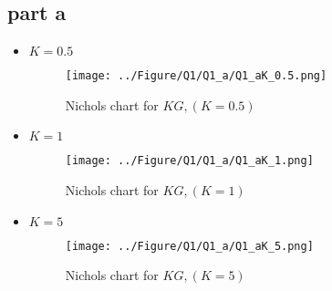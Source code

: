\subsection{part a}
\begin{itemize}
    \item $K=0.5$
    \begin{figure}[H]
        \caption{Nichols chart for $KG, (K=0.5)$}
        \centering
        \texttt{[image: ../Figure/Q1/Q1\_a/Q1\_aK\_0.5.png]}
    \end{figure}
    \item $K=1$
    \begin{figure}[H]
        \caption{Nichols chart for $KG, (K=1)$}
        \centering
        \texttt{[image: ../Figure/Q1/Q1\_a/Q1\_aK\_1.png]}
    \end{figure}
    \item $K=5$
    \begin{figure}[H]
        \caption{Nichols chart for $KG, (K=5)$}
        \centering
        \texttt{[image: ../Figure/Q1/Q1\_a/Q1\_aK\_5.png]}
    \end{figure}
\end{itemize}

